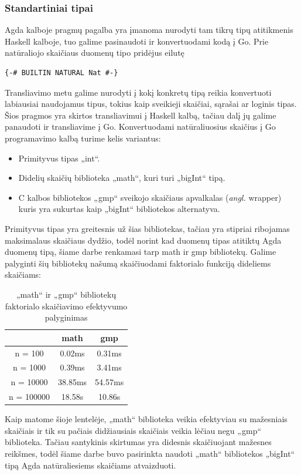 \documentclass{VUMIFPSbakalaurinis}
\begin{document}
\subsubsection{Standartiniai tipai}
Agda kalboje pragmų pagalba yra įmanoma nurodyti tam tikrų tipų atitikmenis Haskell kalboje, tuo galime pasinaudoti ir konvertuodami kodą į Go. Prie natūraliojo skaičiaus duomenų tipo pridėjus eilutę 
\begin{lstlisting}
{-# BUILTIN NATURAL Nat #-}
\end{lstlisting}
Transliavimo metu galime nurodyti į kokį konkretų tipą reikia konvertuoti labiausiai naudojamus tipus, tokius kaip sveikieji skaičiai, sąrašai ar loginis tipas. Šios pragmos yra skirtos transliavimui į Haskell kalbą, tačiau dalį jų galime panaudoti ir transliavime į Go. Konvertuodami natūraliuosius skaičius į Go programavimo kalbą turime kelis variantus:
\begin{itemize}
	\item Primityvus tipas „int“.
	\item Didelių skaičių biblioteka „math“, kuri turi „bigInt“ tipą.
	\item C kalbos bibliotekos „gmp“ sveikojo skaičiaus apvalkalas (\textit{angl.} wrapper) kuris yra sukurtas kaip  „bigInt“ bibliotekos alternatyva.
\end{itemize}
Primityvus tipas yra greitesnis už šias bibliotekas, tačiau yra stipriai ribojamas maksimalaus skaičiaus dydžio, todėl norint kad duomenų tipas atitiktų Agda duomenų tipą, šiame darbe renkamasi tarp math ir gmp bibliotekų. Galime palyginti šių bibliotekų našumą skaičiuodami faktorialo funkciją dideliems skaičiams:
\begin{center}
	\centering
	\begin{table}[H]
		\caption{„math“ ir „gmp“ bibliotekų faktorialo skaičiavimo efektyvumo palyginimas}
		\centering
	\begin{tabular}{ ccc } 
	\toprule
	& \textbf{math} & \textbf{gmp}  \\
	\midrule
	n = 100 & 0.02ms & 0.31ms    \\
	\midrule
	n = 1000 & 0.39ms & 3.41ms  \\
	\midrule
	n = 10000 & 38.85ms & 54.57ms  \\
	\midrule
	n = 100000 & 18.58s & 10.86s  \\
	\bottomrule
	\end{tabular}
	\centering
\end{table}
	\end{center}
	Kaip matome šioje lentelėje, „math“ biblioteka veikia efektyviau su mažesniais skaičiais ir tik su pačiais didžiausiais skaičiais veikia lėčiau negu „gmp“ biblioteka. Tačiau santykinis skirtumas yra didesnis skaičiuojant mažesnes reikšmes, todėl šiame darbe buvo pasirinkta naudoti „math“ bibliotekos „bigInt“ tipą Agda natūraliesiems skaičiams atvaizduoti.
\end{document}
